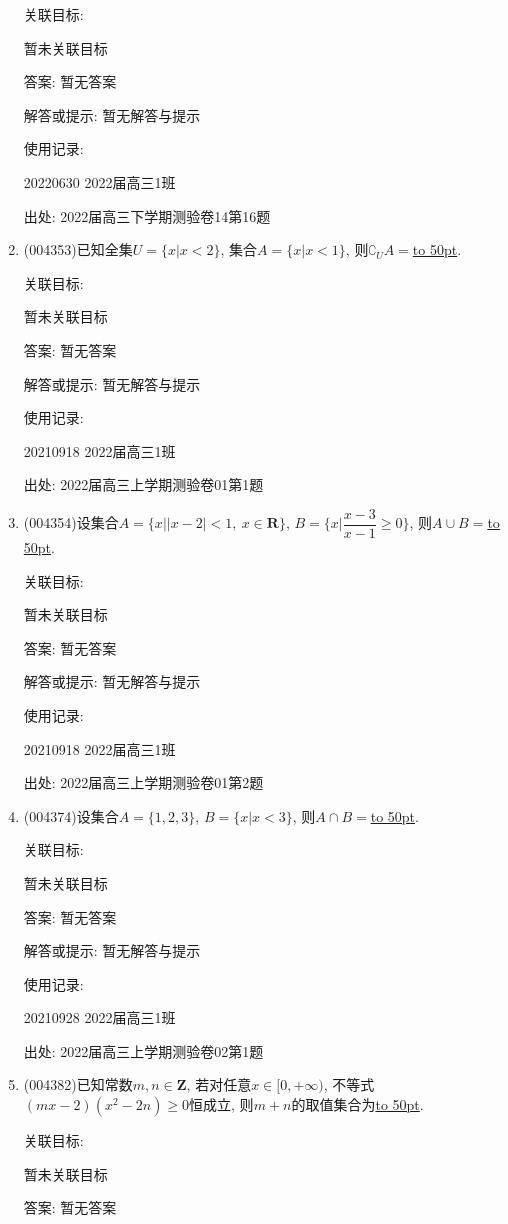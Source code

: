 \documentclass[10pt,a4paper]{article}
\newcommand{\blank}[1]{\underline{\hbox to #1pt{}}}
\begin{document}
\begin{enumerate}[1.]
关联目标:

暂未关联目标

答案: 暂无答案

解答或提示: 暂无解答与提示

使用记录:

20220630	2022届高三1班	


出处: 2022届高三下学期测验卷14第16题
\item { (004353)}已知全集$U=\{x|x<2\}$, 集合$A=\{x|x<1\}$, 则$\complement_UA=$\blank{50}.


关联目标:

暂未关联目标

答案: 暂无答案

解答或提示: 暂无解答与提示

使用记录:

20210918	2022届高三1班	


出处: 2022届高三上学期测验卷01第1题
\item { (004354)}设集合$A=\{x||x-2|<1, \ x\in\mathbf{R}\}$, $B=\{x|\dfrac{x-3}{x-1}\ge 0\}$, 则$A\cup B=$\blank{50}.


关联目标:

暂未关联目标

答案: 暂无答案

解答或提示: 暂无解答与提示

使用记录:

20210918	2022届高三1班	


出处: 2022届高三上学期测验卷01第2题
\item { (004374)}设集合$A=\{1,2,3\}$, $B=\{x|x<3\}$, 则$A\cap B=$\blank{50}.


关联目标:

暂未关联目标

答案: 暂无答案

解答或提示: 暂无解答与提示

使用记录:

20210928	2022届高三1班	


出处: 2022届高三上学期测验卷02第1题
\item { (004382)}已知常数$m,n\in \mathbf{Z}$, 若对任意$x\in [0,+\infty)$, 不等式$(mx-2)(x^2-2n)\ge 0$恒成立, 则$m+n$的取值集合为\blank{50}.


关联目标:

暂未关联目标

答案: 暂无答案


\end{enumerate}
\end{document}
